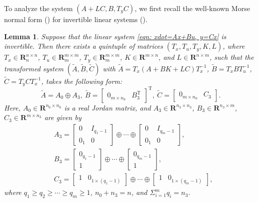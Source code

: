 \documentclass[sort&compress]{elsarticle}
\newtheorem{lemma}{Lemma}
\newcommand\R{\mathbf R}
\newcommand\T{\mathrm T}
\begin{document}
To analyze the system $(A+LC,B,T_yC)$,
we first recall the well-known Morse normal form (\cite{Morse1973SIAM[J]})
for invertible linear systems (\cite{Zhoubook,Zhou2024IJC[J]}).

\begin{lemma}\label{thm: Morse normal form}
Suppose that the linear system \eqref{eqn: xdot=Ax+Bu, y=Cx} is invertible.
Then there exists a quintuple of matrices $(T_x,T_u,T_y,K,L)$, where
$T_x\in\R^{n\times n}_n$, $T_u\in\R^{m\times m}_m$,
$T_y\in\R^{m\times m}_m$, $K\in\R^{m\times n}$, and $L\in\R^{n\times m}$,
such that the transformed system $(\tilde A,\tilde B,\tilde C)$ with
$\tilde A=T_x(A+BK+LC)T_x^{-1}$,
$\tilde B=T_xBT_u^{-1}$,
$\tilde C=T_yCT_x^{-1}$,
takes the following form:
\begin{equation}\label{eqn: Morse normal form's ABC}
\tilde A=A_0\oplus A_3,\
\tilde B=\begin{bmatrix}0_{m\times n_0}&B_3^\T\end{bmatrix}^\T,\
\tilde C=\begin{bmatrix}0_{m\times n_0}&C_3\end{bmatrix}.
\end{equation}
Here, $A_0\in\R^{n_0\times n_0}$ is a real Jordan matrix, and
$A_3\in\R^{n_3\times n_3}$,
$B_3\in\R^{n_3\times m}$,
$C_3\in\R^{m\times n_3}$
are given by
\begin{align*}
&
A_3=
\begin{bmatrix}
0&I_{q_1-1}\\ 0_1&0
\end{bmatrix}
\oplus\cdots\oplus
\begin{bmatrix}
0&I_{q_m-1}\\ 0_1&0
\end{bmatrix},
\\
&
B_3=
\begin{bmatrix}0_{q_1-1}\\ 1\end{bmatrix}
\oplus\cdots\oplus
\begin{bmatrix}0_{q_m-1}\\ 1\end{bmatrix},
\\
&
C_3=
\begin{bmatrix}1&0_{1\times(q_1-1)}\end{bmatrix}
\oplus\cdots\oplus
\begin{bmatrix}1&0_{1\times(q_m-1)}\end{bmatrix},
\end{align*}
where $q_1\ge q_2\ge\cdots\ge q_m\ge1$,
$n_0+n_3=n$, and $\Sigma_{i=1}^mq_i=n_3$.
\end{lemma}
\end{document}
